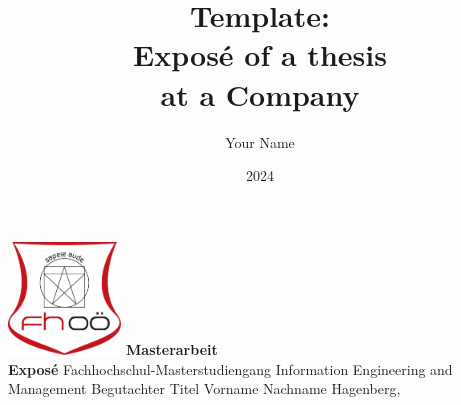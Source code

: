 \documentclass[11pt,a4paper,titlepage]{article}
\title{Template: \protect\\ 
            Expos\'{e} of a thesis \protect\\ 
            at a Company}
\author{Your Name}
\date{2024}
\makeatletter
\let\Title\@title
\let\Author\@author
\let\Date\@date
\makeatother
\begin{document}
\begin{titlepage}
    \rule{0mm}{1mm}
    \vspace*{0mm}
    \begin{center}
        \sffamily
        \setlength{\unitlength}{1cm}
        \parbox[c][5cm][c]{12cm}{
            \centering\LARGE\bfseries
            \setlength{\baselineskip}{25pt}
            \Title
        }
        \vskip 12mm
        \Large{\Author}
        \vskip 12mm
        {\includegraphics[height=30mm]{images/logo.pdf}}
        \vskip 12mm
        {\textbf{\LARGE{Masterarbeit}}} \\
        {\textbf{\LARGE{Expos\'{e}}}}
        \vskip 3mm
        {\large Fachhochschul-Masterstudiengang}
        \vskip 1mm
        {\Large Information Engineering and Management}
        \vskip 3mm
        {\large Begutachter}
        \vskip 1mm
        {\Large Titel Vorname Nachname}
        \vskip 3mm
        {\large Hagenberg, \Date}
    \end{center}%
    \vfil%
\end{titlepage}%




\end{document}
